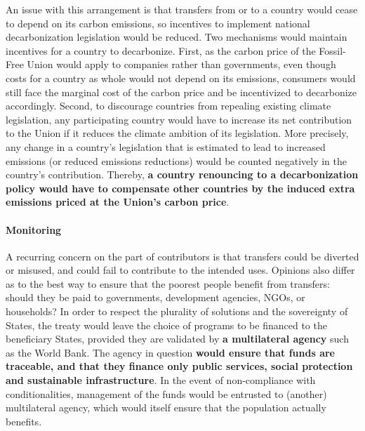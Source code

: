 \documentclass[12pt,english]{article}
\begin{document}
An issue with this arrangement is that transfers from or to a country would cease to depend on its carbon emissions, so incentives to implement national decarbonization legislation would be reduced. Two mechanisms would maintain incentives for a country to decarbonize. First, as the carbon price of the Fossil-Free Union would apply to companies rather than governments, even though costs for a country as whole would not depend on its emissions, consumers would still face the marginal cost of the carbon price and be incentivized to decarbonize accordingly. Second, to discourage countries from repealing existing climate legislation, any participating country would have to increase its net contribution to the Union if it reduces the climate ambition of its legislation. More precisely, any change in a country's legislation that is estimated to lead to increased emissions (or reduced emissions reductions) would be counted negatively in the country's contribution. Thereby, \textbf{a country renouncing to a decarbonization policy would have to compensate other countries by the induced extra emissions priced at the Union's carbon price}.

\paragraph{Monitoring}
A recurring concern on the part of contributors is that transfers could be diverted or misused, and could fail to contribute to the intended uses. Opinions also differ as to the best way to ensure that the poorest people benefit from transfers: should they be paid to governments, development agencies, NGOs, or households? 
In order to respect the plurality of solutions and the sovereignty of States, the treaty would leave the choice of programs to be financed to the beneficiary States, provided they are validated by \textbf{a multilateral agency} such as the World Bank. The agency in question \textbf{would ensure that funds are traceable, and that they finance only public services, social protection and sustainable infrastructure}. In the event of non-compliance with conditionalities, management of the funds would be entrusted to (another) multilateral agency, which would itself ensure that the population actually benefits.
\end{document}
